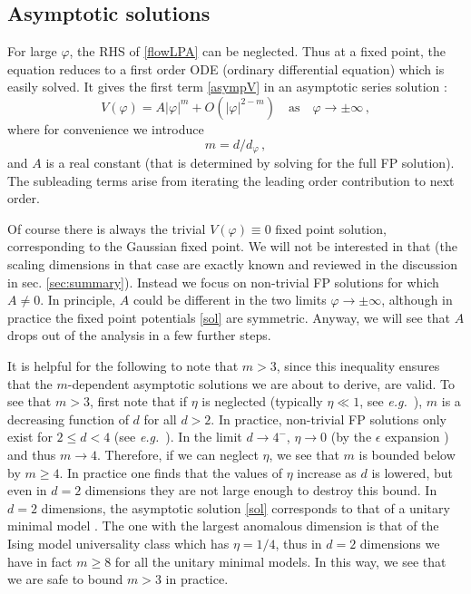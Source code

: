 \documentclass[11pt,a4paper]{article}
\numberwithin{figure}{section}
\numberwithin{equation}{section}
\newcommand{\be}{\begin{equation}}
\newcommand{\ee}{\end{equation}}
\newcommand\eg{\textit{e.g.}\ }
\newcommand{\ph}{\varphi}
\begin{document}
\subsection{Asymptotic solutions}
For large $\varphi$, the RHS of \eqref{flowLPA} can be neglected. Thus at a fixed point, the equation reduces to a first order ODE (ordinary differential equation) which is easily solved. It gives the first term \eqref{asympV} in an asymptotic series solution \cite{Morris:1994ie}:
\begin{equation}
    V(\varphi)= A |\ph|^{m}+O\left(|\ph|^{2-m}\right) \quad \text{as} \quad \ph \rightarrow \pm \infty \,, \label{sol}
\end{equation}
where for convenience we introduce 
\be m = {d}/{d_\ph}\,, \ee 
and $A$ is a real constant (that is determined by solving for the full FP solution). The subleading terms arise from iterating the leading order contribution to next order.

Of course there is always the trivial $V(\ph)\equiv0$ fixed point solution, corresponding to the Gaussian fixed point. We will not be interested in that  (the scaling dimensions in that case are exactly known and reviewed in the discussion in sec. \ref{sec:summary}). Instead we focus on non-trivial FP solutions for which $A\ne0$. In principle, $A$ could be different in the two limits $\ph\to\pm\infty$, although in practice the fixed point potentials \eqref{sol} are symmetric. Anyway, we will see that $A$ drops out of the analysis in a few further steps.  

It is helpful for the following to note that $m>3$, since this inequality ensures that the $m$-dependent asymptotic solutions we are about to derive, are valid. To see that $m>3$, first note that if $\eta$ is neglected (typically $\eta\ll1$, see \eg \cite{ZinnJustin:2002ru}),  $m$ is a decreasing function of $d$ for all $d>2$. In practice, non-trivial FP solutions only exist for $2\le d<4$ (see \eg \cite{Morris:1994ki}). In the limit $d\to4^-$, $\eta\to0$ (by the $\epsilon$ expansion \cite{ZinnJustin:2002ru}) and thus $m\to4$. Therefore, if we can neglect $\eta$, we see that $m$ is bounded below by $m\ge 4$. In practice one finds that the values of $\eta$ increase as $d$ is lowered, but even in $d=2$ dimensions they are not large enough to destroy this bound. 
In $d=2$ dimensions, the asymptotic solution \eqref{sol} corresponds to that of a unitary minimal model \cite{Zamolodchikov:1986db,Morris:1994jc}. The one with the largest anomalous dimension is that of the Ising model universality class which has $\eta=1/4$, thus in $d=2$ dimensions we have in fact $m\ge8$ for all the unitary minimal models. In this way, we see that we are safe to bound $m>3$ in practice.
\end{document}
